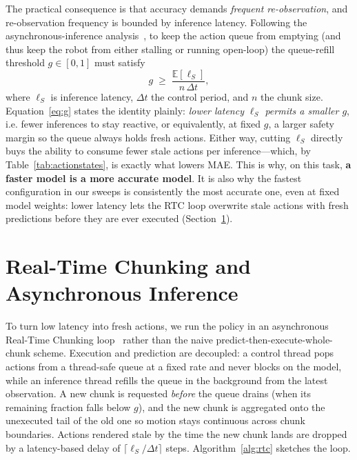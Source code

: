 \documentclass[blind]{gtac}
\begin{document}
The practical consequence is that accuracy demands \emph{frequent re-observation},
and re-observation frequency is bounded by inference latency. Following the
asynchronous-inference analysis~\cite{rtc,smolvla}, to keep the action queue from
emptying (and thus keep the robot from either stalling or running open-loop) the
queue-refill threshold $g\in[0,1]$ must satisfy
%
\begin{equation}
g \;\ge\; \frac{\mathbb{E}[\ell_S]}{n\,\Delta t},
\label{eq:g}
\end{equation}
%
where $\ell_S$ is inference latency, $\Delta t$ the control period, and $n$ the
chunk size. Equation~\eqref{eq:g} states the identity plainly: \emph{lower
latency $\ell_S$ permits a smaller $g$}, i.e. fewer inferences to stay reactive,
or equivalently, at fixed $g$, a larger safety margin so the queue always holds
fresh actions. Either way, cutting $\ell_S$ directly buys the ability to consume
fewer stale actions per inference---which, by Table~\ref{tab:actionstates}, is
exactly what lowers MAE. This is why, on this task, \textbf{a faster model is a
more accurate model}. It is also why the fastest configuration in our sweeps is
consistently the most accurate one, even at fixed model weights: lower latency
lets the RTC loop overwrite stale actions with fresh predictions before they are
ever executed (Section~\ref{sec:rtc}).

\section{Real-Time Chunking and Asynchronous Inference}
\label{sec:rtc}

To turn low latency into fresh actions, we run the policy in an asynchronous
Real-Time Chunking loop~\cite{rtc,smolvla} rather than the naive
predict-then-execute-whole-chunk scheme. Execution and prediction are decoupled:
a control thread pops actions from a thread-safe queue at a fixed rate and never
blocks on the model, while an inference thread refills the queue in the
background from the latest observation. A new chunk is requested \emph{before}
the queue drains (when its remaining fraction falls below $g$), and the new chunk
is aggregated onto the unexecuted tail of the old one so motion stays continuous
across chunk boundaries. Actions rendered stale by the time the new chunk lands
are dropped by a latency-based delay of $\lceil \ell_S/\Delta t\rceil$ steps.
Algorithm~\ref{alg:rtc} sketches the loop.
\end{document}

